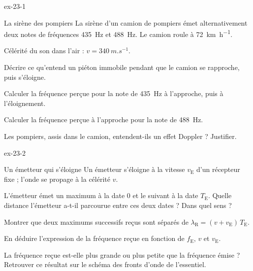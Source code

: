 \begin{blocLivre}{ex-23-1}
\begin{exercice}[1]{La sirène des pompiers}
La sirène d'un camion de pompiers émet alternativement deux notes de fréquences \qty{435}{Hz} et \qty{488}{Hz}. Le camion roule
à \qty{72}{km.h^{-1}}.
\begin{donnees}
Célérité du son dans l'air : $v=\qty{340}{m.s^{-1}}$.
\end{donnees}
\begin{questions}
\item Décrire ce qu'entend un piéton immobile pendant que le camion se rapproche, puis s'éloigne.
\item Calculer la fréquence perçue pour la note de \qty{435}{Hz} à l'approche, puis à l'éloignement.
\item Calculer la fréquence perçue à l'approche pour la note de \qty{488}{Hz}.
\item Les pompiers, assis dans le camion, entendent-ils un effet Doppler ? Justifier.
\end{questions}
\end{exercice}
\end{blocLivre}
\begin{blocLivre}{ex-23-2}
\begin{exercice}[1]{Un émetteur qui s'éloigne}
Un émetteur s'éloigne à la vitesse $v_\mathrm{E}$ d'un récepteur fixe ; l'onde se propage à la célérité $v$.
\begin{questions}
\item L'émetteur émet un maximum à la date 0 et le suivant à la date $T_\mathrm{E}$. Quelle distance l'émetteur a-t-il parcourue
entre ces deux dates ? Dans quel sens ?
\item Montrer que deux maximums successifs reçus sont séparés de $\lambda_\mathrm{R}=(v+v_\mathrm{E})\,T_\mathrm{E}$.
\item En déduire l'expression de la fréquence reçue en fonction de $f_\mathrm{E}$, $v$ et $v_\mathrm{E}$.
\item La fréquence reçue est-elle plus grande ou plus petite que la fréquence émise ? Retrouver ce résultat sur le
schéma des fronts d'onde de l'essentiel.
\end{questions}
\end{exercice}
\end{blocLivre}
